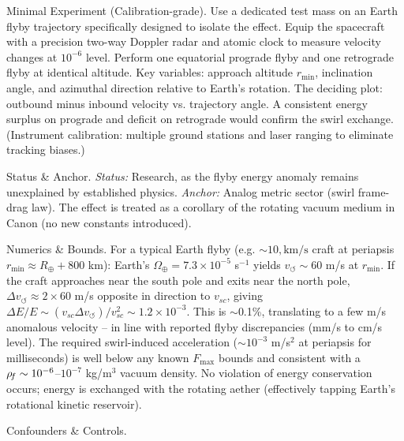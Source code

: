 \documentclass[11pt]{article}
\begin{document}
Minimal Experiment (Calibration-grade). Use a dedicated test mass on an Earth flyby trajectory specifically designed to isolate the effect. Equip the spacecraft with a precision two-way Doppler radar and atomic clock to measure velocity changes at $10^{-6}$ level. Perform one equatorial prograde flyby and one retrograde flyby at identical altitude. Key variables: approach altitude $r_{\min}$, inclination angle, and azimuthal direction relative to Earth’s rotation. The deciding plot: outbound minus inbound velocity vs. trajectory angle. A consistent energy surplus on prograde and deficit on retrograde would confirm the swirl exchange. (Instrument calibration: multiple ground stations and laser ranging to eliminate tracking biases.)


Status & Anchor. \textit{Status:} Research, as the flyby energy anomaly remains unexplained by established physics. \textit{Anchor:} Analog metric sector (swirl frame-drag law). The effect is treated as a corollary of the rotating vacuum medium in Canon (no new constants introduced).


Numerics & Bounds. For a typical Earth flyby (e.g. $\sim 10,\text{km/s}$ craft at periapsis $r_{\min}\approx R_{\oplus}+800$ km): Earth’s $\Omega_{\oplus}=7.3\times10^{-5}$ s$^{-1}$ yields $v_{\circlearrowleft}\sim 60$ m/s at $r_{\min}$. If the craft approaches near the south pole and exits near the north pole, $\Delta v_{\circlearrowleft}\approx 2 \times 60$ m/s opposite in direction to $v_{sc}$, giving $\Delta E/E \sim (v_{sc}\Delta v_{\circlearrowleft})/v_{sc}^2 \sim 1.2\times10^{-3}$. This is $\sim$0.1\%, translating to a few m/s anomalous velocity – in line with reported flyby discrepancies (mm/s to cm/s level). The required swirl-induced acceleration ($\sim 10^{-3}$ m/s$^2$ at periapsis for milliseconds) is well below any known $F_{\max}$ bounds and consistent with a $\rho_{\!f} \sim 10^{-6}$–$10^{-7}$ kg/m$^3$ vacuum density. No violation of energy conservation occurs; energy is exchanged with the rotating aether (effectively tapping Earth’s rotational kinetic reservoir).


Confounders & Controls.
\end{document}
